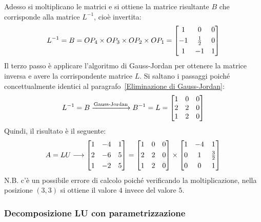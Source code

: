 \documentclass[a4paper]{article}
\makeatletter
\newenvironment{rowequmatbra}[1]{\left[\array{@{}#1@{}}}{\endarray\right]}
\makeatother
\begin{document}
	Adesso si moltiplicano le matrici e si ottiene la matrice risultante $B$ che corrisponde alla matrice $L^{-1}$, cioè invertita:
	\begin{equation*}
		L^{-1} = B = OP_{4} \times OP_{3} \times OP_{2} \times OP_{1} =
		\begin{rowequmatbra}{ccc}
			 1 &  		   0  & 0 \\ [0.3em]
			-1 &  \frac{1}{2} & 0 \\ [0.3em]
			 1 & 		  -1  & 1
		\end{rowequmatbra}
	\end{equation*}
	Il \textcolor{Red3}{terzo passo} è applicare l'algoritmo di Gauss-Jordan per ottenere la matrice inversa e avere la corrispondente matrice $L$. Si saltano i passaggi poiché concettualmente identici al paragrafo~\ref{Eliminazione di Gauss-Jordan}:
	\begin{equation*}
		L^{-1} = B \xlongrightarrow{\text{Gauss-Jordan}} B^{-1} = L = \begin{bmatrix}
			1 & 0 & 0 \\
			2 & 2 & 0 \\
			1 & 2 & 0
		\end{bmatrix}
	\end{equation*}
	Quindi, il risultato è il seguente:
	\begin{equation*}
		A = LU \longrightarrow \begin{rowequmatbra}{ccc}
			1 & -4 & 1 \\ [0.3em]
			2 & -6 & 5 \\ [0.3em]
			1 & -2 & 5
		\end{rowequmatbra} = \begin{rowequmatbra}{ccc}
			1 & 0 & 0 \\ [0.3em]
			2 & 2 & 0 \\ [0.3em]
			1 & 2 & 0
		\end{rowequmatbra} \times \begin{rowequmatbra}{ccc}
			1 & -4 & 1 \\ [0.3em]
			0 &  1 & \frac{3}{2} \\ [0.3em]
			0 &  0 & 1
		\end{rowequmatbra}
	\end{equation*}
	N.B. c'è un possibile errore di calcolo poiché verificando la moltiplicazione, nella posizione $\left(3,3\right)$ si ottiene il valore $4$ invece del valore $5$.\newpage
	
	\subsubsection{Decomposizione LU con parametrizzazione}
	
\end{document}
